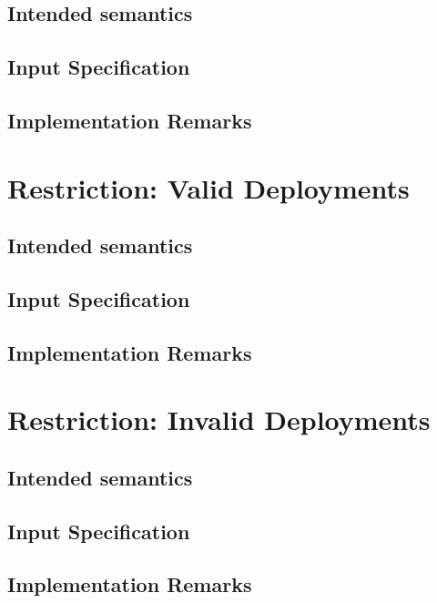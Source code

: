\subsection{Intended semantics}

\subsection{Input Specification}

\subsection{Implementation Remarks}

\section{Restriction: Valid Deployments}

\subsection{Intended semantics}

\subsection{Input Specification}

\subsection{Implementation Remarks}

\section{Restriction: Invalid Deployments}

\subsection{Intended semantics}

\subsection{Input Specification}

\subsection{Implementation Remarks}


